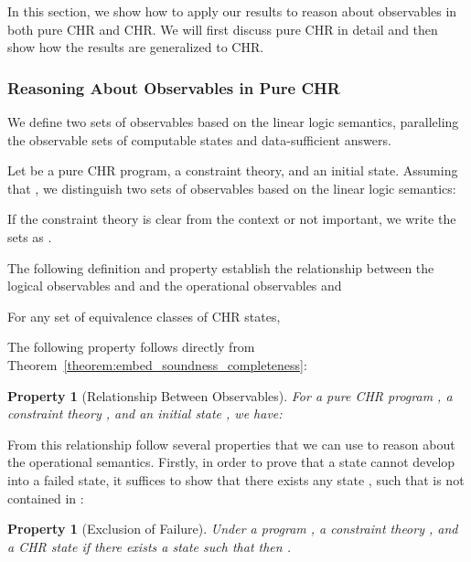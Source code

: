 \documentclass[acmtocl]{acmtrans2m}
\newtheorem{property}[theorem]{Property}
\begin{document}
In this section, we show how to apply our results to reason about observables
in both pure CHR and CHR. We will first discuss pure CHR in detail and
then show how the results are generalized to CHR.

\subsubsection{Reasoning About Observables in Pure CHR}

We define two sets of observables based on the linear logic
semantics, paralleling the observable sets of computable states and
data-sufficient answers.

\begin{definition}
Let  be a pure CHR program,  a constraint theory, and 
an initial state. Assuming that , we distinguish
two sets of observables based on the linear logic semantics:


If the constraint theory  is clear from
the context or not important, we write the sets as .

\end{definition}

The following definition and property establish the relationship between the
logical observables  and  and the operational
observables  and 

\begin{definition}
For any set  of equivalence classes of CHR states,

\end{definition}

The following property follows directly from
Theorem~\ref{theorem:embed_soundness_completeness}:

\begin{property}[Relationship Between Observables]
For a pure CHR program , a constraint theory , and an initial
state , we have:

\end{property}

From this relationship follow several properties that we can use to reason about
the operational semantics. Firstly, in order to prove that a state  cannot
develop into a failed state, it suffices to show that there exists any state ,
such that  is not contained in :

\begin{property}[Exclusion of Failure]
\label{lemma:app-exclude-fail}
Under a program , a constraint theory , and a CHR state  if there
exists a state  such that  then
.
\end{property}
\end{document}
